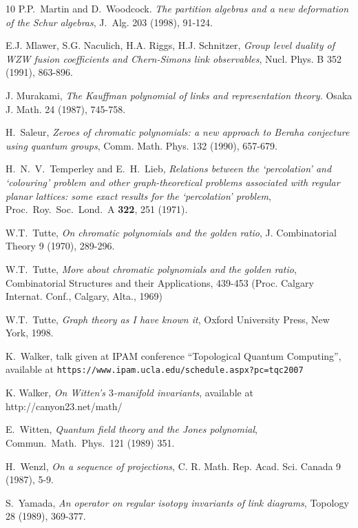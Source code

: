 \documentclass[11pt]{amsart}
\numberwithin{equation}{section}
\theoremstyle{definition}
\begin{document}
\begin{thebibliography}{10}
 P.P.~Martin and D.~Woodcock.
{\em The partition algebras and a new
deformation of the Schur algebras}, J.~Alg. 203 (1998), 91-124.

 E.J. Mlawer, S.G. Naculich, H.A. Riggs, H.J. Schnitzer,
{\em Group level duality of WZW fusion coefficients and Chern-Simons link
observables}, Nucl. Phys. B 352 (1991), 863-896.

 J. Murakami, {\em The Kauffman polynomial of links and representation theory.}
Osaka J. Math. 24 (1987), 745-758.

 H.~Saleur, {\em Zeroes of chromatic polynomials: a new approach to Beraha conjecture
using quantum groups},  Comm. Math. Phys.  132  (1990),  657-679.


H.~N.~V.~Temperley and E.~H.~Lieb,
{\em Relations between the `percolation' and `colouring' problem and other
graph-theoretical problems associated with regular planar lattices: some
exact results for the `percolation' problem},
  Proc.\ Roy.\ Soc.\ Lond.\  A {\bf 322}, 251 (1971).

 W.T.~Tutte, {\em On chromatic polynomials and the golden ratio}, J. Combinatorial Theory 9 (1970),
289-296.

 W.T.~Tutte, {\em More about chromatic polynomials and the golden ratio}, Combinatorial Structures
and their Applications, 439-453 (Proc. Calgary Internat. Conf., Calgary, Alta., 1969)

 W.T.~Tutte, {\em Graph theory as I have known it}, Oxford University Press, New York, 1998.


 K.~Walker, talk given at IPAM conference
  ``Topological Quantum Computing'', available at
{\tt https://www.ipam.ucla.edu/schedule.aspx?pc=tqc2007}

 K. Walker,
  {\em On Witten's $3$-manifold invariants}, available at
  http://canyon23.net/math/

   E.~Witten,
  {\em Quantum field theory and the Jones polynomial},
  Commun.\ Math.\ Phys.\  {121} (1989) 351.

 H.~Wenzl,
{\em On a sequence of projections},  C. R. Math. Rep. Acad. Sci. Canada  9  (1987), 5-9.

 S.~Yamada, {\em An operator on regular isotopy invariants of link diagrams},  Topology  28
(1989), 369-377.






\end{thebibliography}
\end{document}
